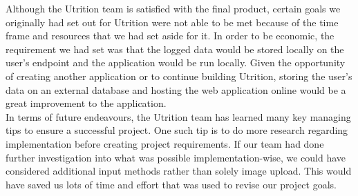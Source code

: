 \documentclass{article}
\begin{document}
Although the Utrition team is satisfied with the final product, certain goals we originally had set out for Utrition were not able to be met because of the time frame and resources that we had set aside for it. In order to be economic, the requirement we had set was that the logged data would be stored locally on the user's endpoint and the application would be run locally. Given the opportunity of creating another application or to continue building Utrition, storing the user's data on an external database and hosting the web application online would be a great improvement to the application.\\

In terms of future endeavours, the Utrition team has learned many key managing tips to ensure a successful project. One such tip is to do more research regarding implementation before creating project requirements. If our team had done further investigation into what was possible implementation-wise, we could have considered additional input methods rather than solely image upload. This would have saved us lots of time and effort that was used to revise our project goals. 
\end{document}
